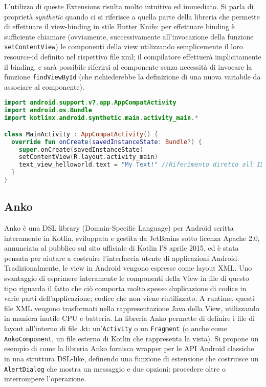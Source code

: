 L'utilizzo di queste Extensions risulta molto intuitivo ed immediato. Si parla di proprietà {\em synthetic} quando ci si riferisce a quella parte della libreria che permette di effettuare il view-binding in stile Butter Knife: per effettuare binding è sufficiente chiamare (ovviamente, successivamente all'invocazione della funzione \texttt{setContentView}) le componenti della view utilizzando semplicemente il loro resource-id definito nel rispettivo file xml; il compilatore effettuerà implicitamente il binding, e sarà possibile riferirsi al componente senza necessità di invocare la funzione \texttt{findViewById} (che richiederebbe la definizione di una nuova variabile da associare al componente).\\

\begin{lstlisting}[caption={Utilizzo delle proprietà synthetic di KAE}, captionpos=b, label={lst:exAmpleKAE}, language=Kotlin]
import android.support.v7.app.AppCompatActivity
import android.os.Bundle
import kotlinx.android.synthetic.main.activity_main.*

class MainActivity : AppCompatActivity() {
  override fun onCreate(savedInstanceState: Bundle?) {
    super.onCreate(savedInstanceState)
    setContentView(R.layout.activity_main)
    text_view_helloworld.text = "My Text!" //Riferimento diretto all'ID xml
  }
}
\end{lstlisting}

\subsection{Anko}
Anko è una DSL library (Domain-Specific Language) per Android scritta interamente in Kotlin, sviluppata e gestita da JetBrains sotto licenza Apache 2.0, annunciata al pubblico sul sito ufficiale di Kotlin l'8 aprile 2015, ed è stata pensata per aiutare a costruire l'interfaccia utente di applicazioni Android.\\ Tradizionalmente, le view in Android vengono espresse come layout XML. Uno svantaggio di esprimere interamente le componenti della View in file di questo tipo riguarda il fatto che ciò comporta molto spesso duplicazione di codice in varie parti dell'applicazione; codice che non viene riutilizzato. A runtime, questi file XML vengono trasformati nella rappresentazione Java della View, utilizzando in maniera inutile CPU e batteria. La libreria Anko permette di definire i file di layout all'interno di file .kt: un'\texttt{Activity} o un \texttt{Fragment} (o anche come \texttt{AnkoComponent}, un file esterno di Kotlin che rappresenta la vista). Si propone un esempio di come la libreria Anko fornisca wrapper per le API Android classiche in una struttura DSL-like, definendo una funzione di estensione che costruisce un \texttt{AlertDialog} che mostra un messaggio e due opzioni: procedere oltre o interrompere l'operazione.\\

